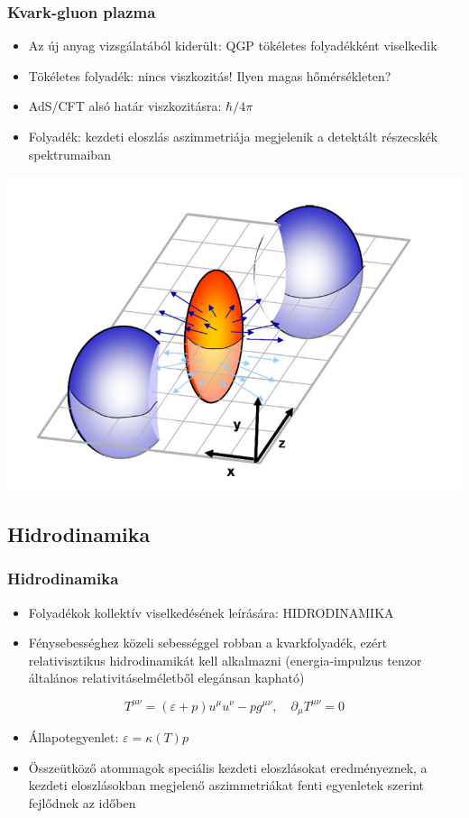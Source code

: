\documentclass{beamer}
\begin{document}
\begin{frame}
\frametitle{Kvark-gluon plazma}
\begin{itemize}
\item Az új anyag vizsgálatából kiderült: QGP tökéletes folyadékként viselkedik
\item Tökéletes folyadék: nincs viszkozitás! Ilyen magas hőmérsékleten?
\item AdS/CFT alsó határ viszkozitásra: $\hbar/4\pi$
\item Folyadék: kezdeti eloszlás aszimmetriája megjelenik a detektált részecskék spektrumaiban 
\end{itemize}
\begin{center}
\includegraphics[scale=0.3]{pic/p2}
\end{center}
\end{frame}

\subsection{Hidrodinamika}
\begin{frame}
\frametitle{Hidrodinamika}
\begin{itemize}
\item Folyadékok kollektív viselkedésének leírására: HIDRODINAMIKA
\item Fénysebességhez közeli sebességgel robban a kvarkfolyadék, ezért relativisztikus hidrodinamikát kell alkalmazni (energia-impulzus tenzor általános relativitáselméletből elegánsan kapható)
\end{itemize}
\begin{center}
\begin{equation}
T^{\mu\nu}=(\varepsilon+p)u^\mu u^\nu - p g^{\mu\nu}, \quad  \partial_\mu T^{\mu\nu}=0
\end{equation}
\end{center}
\begin{itemize}
\item Állapotegyenlet: $\varepsilon=\kappa(T)p$
\item Összeütköző atommagok speciális kezdeti eloszlásokat eredményeznek, a kezdeti eloszlásokban megjelenő aszimmetriákat fenti egyenletek szerint fejlődnek az időben
\end{itemize}
\end{frame}
\end{document}
